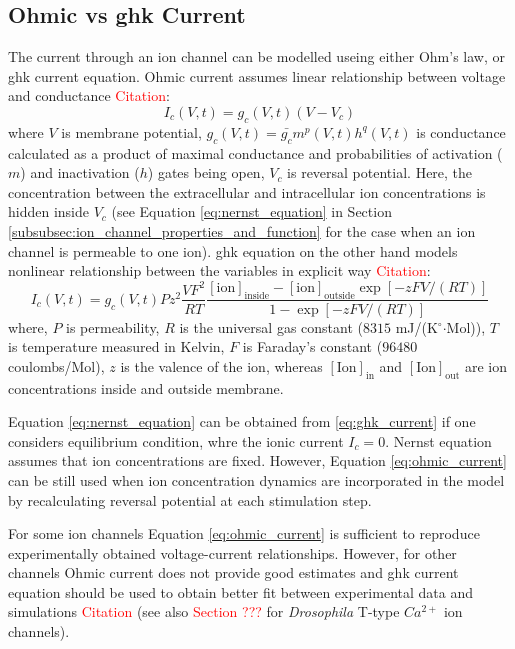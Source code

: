 \documentclass[../main.tex]{subfiles}
\begin{document}
\subsection{Ohmic vs \texorpdfstring{\gls{ghk}}{GHK} Current}

The current through an ion channel can be modelled useing either Ohm's law, or
\gls{ghk} current equation. Ohmic current assumes linear relationship between
voltage and conductance \textcolor{red}{Citation}:
\begin{equation}\label{eq:ohmic_current}
    I_{c}(V,t) = g_c(V,t)(V - V_c)
\end{equation}
where $V$ is membrane potential, $g_c(V,t)=\bar{g_c}m^p(V,t)h^q(V,t)$ is conductance calculated
as a product of maximal conductance and probabilities of activation ($m$) and
inactivation ($h$) gates being open, $V_c$ is reversal potential. Here, the
concentration between the extracellular and intracellular ion concentrations
is hidden inside $V_c$
(see Equation \ref{eq:nernst_equation} in Section \ref{subsubsec:ion_channel_properties_and_function}
for the case when an ion channel is permeable to one ion).
\gls{ghk} equation on the other hand models nonlinear relationship between the variables in
explicit way \textcolor{red}{Citation}:
\begin{equation}\label{eq:ghk_current}
    I_c(V,t) = g_c(V,t) P z^2 \frac{VF^2}{RT}\frac{[\text{ion}]_{\text{inside}} - [\text{ion}]_{\text{outside}} \exp{[-zFV/(RT)]} }{1 - \exp{[-zFV/(RT)]}}
\end{equation}
where, $P$ is permeability, $R$ is the universal gas constant ($8315$ mJ/(K$^\circ$$\cdot$Mol)), $T$ is temperature measured
in Kelvin, $F$ is Faraday's constant ($96480$ coulombs/Mol), $z$ is the valence of the ion,
whereas $[\text{Ion}]_{\text{in}}$ and $[\text{Ion}]_{\text{out}}$ are ion concentrations inside and outside membrane.

Equation \ref{eq:nernst_equation} can be obtained from \ref{eq:ghk_current} if one considers
equilibrium condition, whre the ionic current $I_c=0$. Nernst equation assumes that ion concentrations
are fixed. However, Equation \ref{eq:ohmic_current} can be still used when ion concentration dynamics
are incorporated in the model by recalculating reversal potential at each stimulation step.

For some ion channels Equation \ref{eq:ohmic_current} is sufficient to reproduce experimentally obtained
voltage-current relationships. However, for other channels Ohmic current does not provide good
estimates and \gls{ghk} current equation should be used to obtain better fit between
experimental data and simulations \textcolor{red}{Citation} (see also \textcolor{red}{Section ???} for
\textit{Drosophila} T-type $Ca^{2+}$ ion channels).
\end{document}
